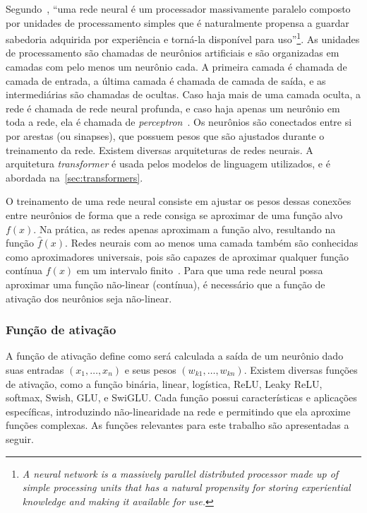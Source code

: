 \documentclass[journal]{IEEEtran}
\begin{document}
Segundo~\cite{haykin2009neural}, ``uma rede neural é um processador massivamente paralelo composto por unidades de processamento simples que é naturalmente propensa a guardar sabedoria adquirida por experiência e torná-la disponível para uso''\footnote{%
\textit{A neural network is a massively parallel distributed processor made up of simple processing units that has a natural propensity for storing experiential knowledge and making it available for use.}}.
As unidades de processamento são chamadas de neurônios artificiais e são organizadas em camadas com pelo menos um neurônio cada.
A primeira camada é chamada de camada de entrada, a última camada é chamada de camada de saída, e as intermediárias são chamadas de ocultas.
Caso haja mais de uma camada oculta, a rede é chamada de rede neural profunda, e caso haja apenas um neurônio em toda a rede, ela é chamada de \textit{perceptron}~\cite{minsky1969perceptrons}.
Os neurônios são conectados entre si por arestas (ou sinapses), que possuem pesos que são ajustados durante o treinamento da rede.
Existem diversas arquiteturas de redes neurais.
A arquitetura \textit{transformer} é usada pelos modelos de linguagem utilizados, e é abordada na~\cref{sec:transformers}.

O treinamento de uma rede neural consiste em ajustar os pesos dessas conexões entre neurônios de forma que a rede consiga se aproximar de uma função alvo $f(x)$.
Na prática, as redes apenas aproximam a função alvo, resultando na função $\hat{f}(x)$.
Redes neurais com ao menos uma camada também são conhecidas como aproximadores universais, pois são capazes de aproximar qualquer função contínua $f(x)$ em um intervalo finito~\cite{hornik1989multilayer}.
Para que uma rede neural possa aproximar uma função não-linear (contínua), é necessário que a função de ativação dos neurônios seja não-linear.

\subsubsection{Função de ativação}

\noindent%
A função de ativação define como será calculada a saída de um neurônio dado suas entradas $(x_1,\dotsc,x_n)$ e seus pesos $(w_{k1},\dotsc,w_{kn})$.
Existem diversas funções de ativação, como a função binária, linear, logística, ReLU, Leaky ReLU, softmax, Swish, GLU, e SwiGLU\@.
Cada função possui características e aplicações específicas, introduzindo não-linearidade na rede e permitindo que ela aproxime funções complexas.
As funções relevantes para este trabalho são apresentadas a seguir.
\end{document}
